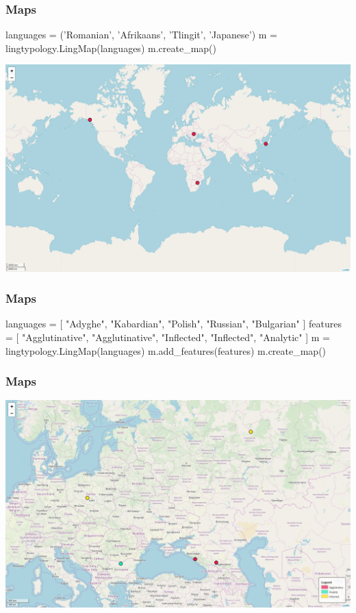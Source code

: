 \documentclass{beamer}
\begin{document}
\begin{frame}[fragile]
\frametitle{Maps}
\begin{python}
languages = ('Romanian', 'Afrikaans', 'Tlingit', 'Japanese')
m = lingtypology.LingMap(languages)
m.create_map()
\end{python}
\includegraphics[width=\textwidth]{images/SimpleMap.png}
\end{frame}

\begin{frame}[fragile]
\frametitle{Maps}
\begin{python}
languages = [
    "Adyghe", "Kabardian", "Polish",
    "Russian", "Bulgarian"
]
features = [
    "Agglutinative", "Agglutinative", "Inflected",
    "Inflected", "Analytic"
]
m = lingtypology.LingMap(languages)
m.add_features(features)
m.create_map()
\end{python}
\end{frame}

\begin{frame}
\frametitle{Maps}
\includegraphics[width=\textwidth]{images/FeaturesMap.png}
\end{frame}
\end{document}
